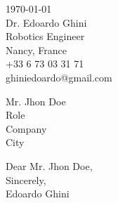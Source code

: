 \documentclass[12pt]{article}
\begin{document}
\begin{FlushRight}
\today\\
\bigskip
{\sffamily Dr. Edoardo Ghini}\\
\textcolor{headings}{Robotics Engineer}\\
\medskip
Nancy, France\\
+33 6 73 03 31 71\\
ghiniedoardo@gmail.com
\end{FlushRight}

\begin{FlushLeft}
Mr. Jhon Doe\\
Role\\
Company\\
City

\vspace{2cm}
Dear Mr. Jhon Doe,\\


%



%
\bigskip
\bigskip
Sincerely,\\
Edoardo Ghini
\end{FlushLeft}
\end{document}
